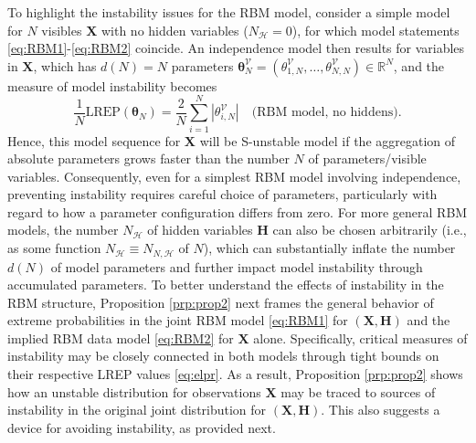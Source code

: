 \documentclass[]{article}
\theoremstyle{definition}
\newcommand{\REP}{\mathrm{LREP}}
\begin{document}
To highlight the instability issues for the RBM model, consider a simple
model for \(N\) visibles \(\boldsymbol X\) with no hidden variables
(\(N_{\mathcal{H}}=0\)), for which model statements
\eqref{eq:RBM1}-\eqref{eq:RBM2} coincide. An independence model then results
for variables in \(\boldsymbol X\), which has \(d(N)=N\) parameters
\(\boldsymbol \theta_N^{\mathcal{V}} = (\theta_{1,N}^{\mathcal{V}}, \ldots, \theta_{N,N}^{\mathcal{V}}) \in \mathbb{R}^{N}\),
and the measure of model instability becomes \[
\frac{1}{N}\REP(\boldsymbol \theta_N) = \frac{2}{N} \sum_{i=1}^N|\theta_{i,N}^{\mathcal{V}}| \quad \mbox{(RBM model, no hiddens)}.
\] Hence, this model sequence for \(\boldsymbol X\) will be S-unstable
model if the aggregation of absolute parameters grows faster than the
number \(N\) of parameters/visible variables. Consequently, even for a
simplest RBM model involving independence, preventing instability
requires careful choice of parameters, particularly with regard to how a
parameter configuration differs from zero. For more general RBM models,
the number \(N_{\mathcal{H}}\) of hidden variables \(\boldsymbol H\) can
also be chosen arbitrarily (i.e., as some function
\(N_{\mathcal{H}}\equiv N_{N,\mathcal{H}}\) of \(N\)), which can
substantially inflate the number \(d(N)\) of model parameters and
further impact model instability through accumulated parameters. To
better understand the effects of instability in the RBM structure,
Proposition \ref{prp:prop2} next frames the general behavior of extreme
probabilities in the joint RBM model \eqref{eq:RBM1} for
\((\boldsymbol X, \boldsymbol H)\) and the implied RBM data model
\eqref{eq:RBM2} for \(\boldsymbol X\) alone. Specifically, critical
measures of instability may be closely connected in both models through
tight bounds on their respective LREP values \eqref{eq:elpr}. As a result,
Proposition \ref{prp:prop2} shows how an unstable distribution for
observations \(\boldsymbol X\) may be traced to sources of instability
in the original joint distribution for
\((\boldsymbol X,\boldsymbol H)\). This also suggests a device for
avoiding instability, as provided next.
\end{document}
